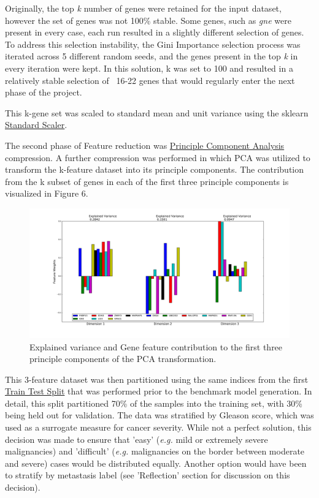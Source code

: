 \documentclass[final]{article}
\begin{document}
Originally, the top \textit{k} number of genes were retained for the
input dataset, however the set of genes was not 100\% stable.  Some genes, such as
\textit{gne} were present in every case, each run resulted in a slightly different selection
of genes.  To address this selection instability, the Gini Importance selection
process was iterated across 5 different random seeds, and the genes present in the top
\textit{k} in every iteration were kept.  In this solution, k was set to 100 and resulted
in a relatively stable selection of ~16-22 genes that would regularly enter the
next phase of the project.

This k-gene set was scaled to standard mean and unit variance using the sklearn
\href{http://scikit-learn.org/stable/modules/generated/sklearn.preprocessing.StandardScaler.html#sklearn.preprocessing.StandardScaler}{Standard Scaler}.

The second phase of Feature reduction was \href{http://scikit-learn.org/stable/modules/generated/sklearn.decomposition.PCA.html#sklearn.decomposition.PCA}{Principle Component Analysis}
compression. A further compression was performed in which PCA was utilized to
transform the k-feature dataset into its principle components.  The contribution
from the k subset of genes in each of the first three principle components is visualized
in Figure 6.

\begin{figure}[h]
  \centering
  \includegraphics[width=\textwidth]{pcaEV}
  \caption{Explained variance and Gene feature contribution to the first three principle components of the PCA transformation.\label{fig:pcaEV}}
\end{figure}

This 3-feature dataset was then partitioned using the same indices from the
first \href{http://scikit-learn.org/stable/modules/generated/sklearn.cross_validation.train_test_split.html}{Train Test Split}
that was performed prior to the benchmark model generation.  In detail, this
split  partitioned 70\% of the samples into the training set, with 30\% being held
out for validation.  The  data was stratified by Gleason score, which was used
as a surrogate measure for cancer severity. While not a perfect solution, this
decision was made to ensure that 'easy' (\textit{e.g.} mild or extremely severe
malignancies) and 'difficult' (\textit{e.g.} malignancies on the border between
moderate and severe) cases would be distributed equally.  Another option would
have been to stratify by  metastasis label (see 'Reflection' section for  %
discussion on this decision).
\end{document}
